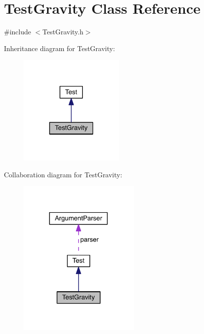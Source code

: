 \hypertarget{class_test_gravity}{}\section{Test\+Gravity Class Reference}
\label{class_test_gravity}


{\ttfamily \#include $<$Test\+Gravity.\+h$>$}



Inheritance diagram for Test\+Gravity\+:\nopagebreak
\begin{figure}[H]
\begin{center}
\leavevmode
\includegraphics[width=146pt]{da/d54/class_test_gravity__inherit__graph}
\end{center}
\end{figure}


Collaboration diagram for Test\+Gravity\+:\nopagebreak
\begin{figure}[H]
\begin{center}
\leavevmode
\includegraphics[width=169pt]{d4/d6e/class_test_gravity__coll__graph}
\end{center}
\end{figure}
